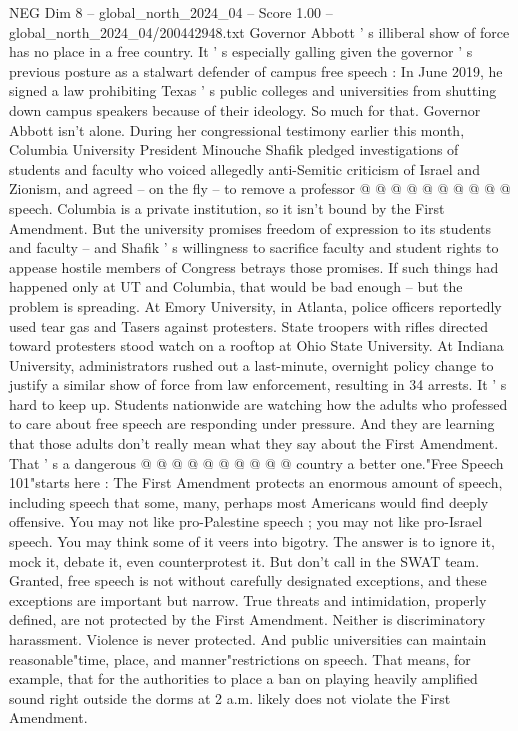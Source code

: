 \begin{textsample}{NEG Dim 8 – global\_north\_2024\_04 – Score 1.00 – global\_north\_2024\_04/200442948.txt}
Governor Abbott ' s illiberal show of force has no place in a free country.
It ' s especially galling given the governor ' s previous posture as a stalwart defender of campus free speech : In June 2019, he signed a law prohibiting Texas ' s public colleges and universities from shutting down campus speakers because of their ideology.
So much for that.
Governor Abbott isn't alone.
During her congressional testimony earlier this month, Columbia University President Minouche Shafik pledged investigations of students and faculty who voiced allegedly anti-Semitic criticism of Israel and Zionism, and agreed -- on the fly -- to remove a professor @ @ @ @ @ @ @ @ @ @ speech.
Columbia is a private institution, so it isn't bound by the First Amendment.
But the university promises freedom of expression to its students and faculty -- and Shafik ' s willingness to sacrifice faculty and student rights to appease hostile members of Congress betrays those promises.
If such things had happened only at UT and Columbia, that would be bad enough -- but the problem is spreading.
At Emory University, in Atlanta, police officers reportedly used tear gas and Tasers against protesters.
State troopers with rifles directed toward protesters stood watch on a rooftop at Ohio State University.
At Indiana University, administrators rushed out a last-minute, overnight policy change to justify a similar show of force from law enforcement, resulting in 34 arrests.
It ' s hard to keep up.
Students nationwide are watching how the adults who professed to care about free speech are responding under pressure.
And they are learning that those adults don't really mean what they say about the First Amendment.
That ' s a dangerous @ @ @ @ @ @ @ @ @ @ country a better one."Free Speech 101"starts here : The First Amendment protects an enormous amount of speech, including speech that some, many, perhaps most Americans would find deeply offensive.
You may not like pro-Palestine speech ; you may not like pro-Israel speech.
You may think some of it veers into bigotry.
The answer is to ignore it, mock it, debate it, even counterprotest it.
But don't call in the SWAT team.
Granted, free speech is not without carefully designated exceptions, and these exceptions are important but narrow.
True threats and intimidation, properly defined, are not protected by the First Amendment.
Neither is discriminatory harassment.
Violence is never protected.
And public universities can maintain reasonable"time, place, and manner"restrictions on speech.
That means, for example, that for the authorities to place a ban on playing heavily amplified sound right outside the dorms at 2 a.m. likely does not violate the First Amendment.

\end{textsample}
